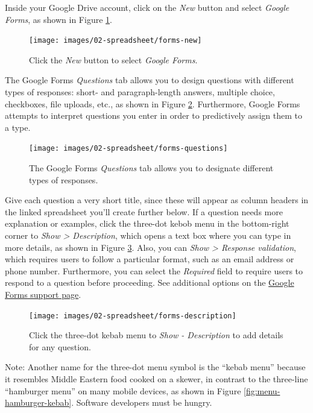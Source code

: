 \documentclass[
  english,
]{book}
\begin{document}
Inside your Google Drive account, click on the \emph{New} button and select \emph{Google Forms}, as shown in Figure \ref{fig:forms-new}.



\begin{figure}
\texttt{[image: images/02-spreadsheet/forms-new]} \caption{Click the \emph{New} button to select \emph{Google Forms}.}\label{fig:forms-new}
\end{figure}

The Google Forms \emph{Questions} tab allows you to design questions with different types of responses: short- and paragraph-length answers, multiple choice, checkboxes, file uploads, etc., as shown in Figure \ref{fig:forms-questions}. Furthermore, Google Forms attempts to interpret questions you enter in order to predictively assign them to a type.



\begin{figure}
\texttt{[image: images/02-spreadsheet/forms-questions]} \caption{The Google Forms \emph{Questions} tab allows you to designate different types of responses.}\label{fig:forms-questions}
\end{figure}

Give each question a very short title, since these will appear as column headers in the linked spreadsheet you'll create further below. If a question needs more explanation or examples, click the three-dot kebob menu in the bottom-right corner to \emph{Show \textgreater{} Description}, which opens a text box where you can type in more details, as shown in Figure \ref{fig:forms-description}. Also, you can \emph{Show \textgreater{} Response validation}, which requires users to follow a particular format, such as an email address or phone number. Furthermore, you can select the \emph{Required} field to require users to respond to a question before proceeding. See additional options on the \href{https://support.google.com/a/users/answer/9991170}{Google Forms support page}.



\begin{figure}
\texttt{[image: images/02-spreadsheet/forms-description]} \caption{Click the three-dot kebab menu to \emph{Show - Description} to add details for any question.}\label{fig:forms-description}
\end{figure}

Note: Another name for the three-dot menu symbol is the ``kebab menu'' because it resembles Middle Eastern food cooked on a skewer, in contrast to the three-line ``hamburger menu'' on many mobile devices, as shown in Figure \ref{fig:menu-hamburger-kebab}. Software developers must be hungry.
\end{document}

